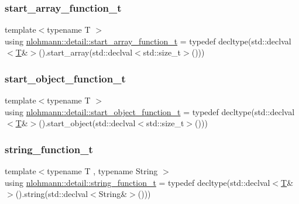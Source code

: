 \mbox{\label{namespacenlohmann_1_1detail_a80273cecc45765d7b2826ec931fbffdd}} 
\subsubsection{\texorpdfstring{start\_array\_function\_t}{start\_array\_function\_t}}
{\footnotesize\ttfamily template$<$typename T $>$ \\
using \mbox{\hyperlink{namespacenlohmann_1_1detail_a80273cecc45765d7b2826ec931fbffdd}{nlohmann\+::detail\+::start\+\_\+array\+\_\+function\+\_\+t}} = typedef decltype(std\+::declval$<$\mbox{\hyperlink{_keyboard_event_8h_adf1f3edb9115acb0a1e04209b7a9937b}{T}}\&$>$().start\+\_\+array(std\+::declval$<$std\+::size\+\_\+t$>$()))}

\mbox{\label{namespacenlohmann_1_1detail_a5fff1e6dcaabd367d9b1109a5682f9d4}} 
\subsubsection{\texorpdfstring{start\_object\_function\_t}{start\_object\_function\_t}}
{\footnotesize\ttfamily template$<$typename T $>$ \\
using \mbox{\hyperlink{namespacenlohmann_1_1detail_a5fff1e6dcaabd367d9b1109a5682f9d4}{nlohmann\+::detail\+::start\+\_\+object\+\_\+function\+\_\+t}} = typedef decltype(std\+::declval$<$\mbox{\hyperlink{_keyboard_event_8h_adf1f3edb9115acb0a1e04209b7a9937b}{T}}\&$>$().start\+\_\+object(std\+::declval$<$std\+::size\+\_\+t$>$()))}

\mbox{\label{namespacenlohmann_1_1detail_a27c3fc3bd42ac406f763184aa8ae4cb0}} 
\subsubsection{\texorpdfstring{string\_function\_t}{string\_function\_t}}
{\footnotesize\ttfamily template$<$typename T , typename String $>$ \\
using \mbox{\hyperlink{namespacenlohmann_1_1detail_a27c3fc3bd42ac406f763184aa8ae4cb0}{nlohmann\+::detail\+::string\+\_\+function\+\_\+t}} = typedef decltype(std\+::declval$<$\mbox{\hyperlink{_keyboard_event_8h_adf1f3edb9115acb0a1e04209b7a9937b}{T}}\&$>$().string(std\+::declval$<$String\&$>$()))}

